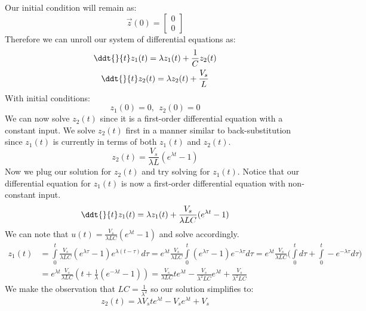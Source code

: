 {  Our initial condition will remain as:
  $$\vec{z}(0) = \begin{bmatrix} 0 \\ 0 \end{bmatrix}$$
  Therefore we can unroll our system of differential equations as:
  \begin{gather*}
  \ddt{}{t} z_{1}(t) = \lambda z_{1}(t) + \frac{1}{C} z_{2}(t) \\
  \ddt{}{t} z_{2}(t) = \lambda z_{2}(t) + \frac{V_s}{L} \\
  \end{gather*}
  With initial conditions:
  $$z_{1}(0) = 0, \ \  z_{2}(0) = 0$$
  We can now solve $z_{2}(t)$ since it is a first-order differential equation with a constant input. 
  We solve $z_{2}(t)$ first in a manner similar to back-substitution since $z_{1}(t)$ is currently in terms of both $z_{1}(t)$ and $z_{2}(t).$
  $$z_{2}(t) = \frac{V_s}{\lambda L} (e^{\lambda t} - 1)$$
  Now we plug our solution for $z_{2}(t)$ and try solving for $z_{1}(t).$ 
  Notice that our differential equation for $z_{1}(t)$ is now a first-order differential equation with non-constant input.
  $$\ddt{}{t} z_{1}(t) = \lambda z_{1}(t) + \frac{V_s}{\lambda LC} (e^{\lambda t} - 1)$$
  We can note that $u(t) = \frac{V_s}{\lambda LC} (e^{\lambda t} - 1)$ and solve accordingly.
  \begin{align*}
  z_{1}(t) &= \int\limits_{0}^t \frac{V_s}{\lambda LC} (e^{\lambda \tau} - 1) e^{\lambda(t - \tau)} d\tau = 
  e^{\lambda t} \frac{V_s}{\lambda LC} \int\limits_{0}^t (e^{\lambda \tau} - 1) e^{- \lambda \tau} d\tau 
  = e^{\lambda t} \frac{V_s}{\lambda LC} \big(\int\limits_{0}^t d\tau + \int\limits_{0}^t -e^{-\lambda \tau} d\tau \big) \\
  &= e^{\lambda t} \frac{V_s}{\lambda LC} (t + \frac{1}{\lambda}(e^{-\lambda t} - 1)) = \frac{V_s}{\lambda LC} t e^{\lambda t} - \frac{V_s}{\lambda^2 LC} e^{\lambda t} + \frac{V_s}{\lambda^2 LC}
  \end{align*}
  We make the observation that $LC = \frac{1}{\lambda^2}$ so our solution simplifies to:
  $$z_{2}(t) = \lambda V_s t e^{\lambda t} - V_s e^{\lambda t} + V_s$$

}
